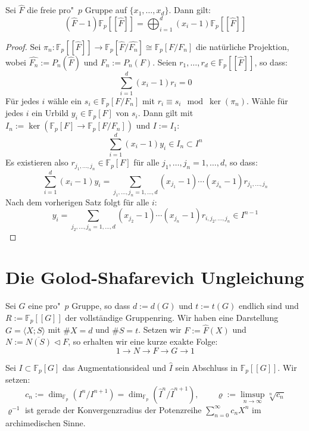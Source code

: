 \documentclass[11pt,a4paper,openany]{memoir}
\begin{document}
\begin{proposition}\label{prop:Ex2}
Sei $\widehat{F}$ die freie pro"~$p$ Gruppe auf $\{x_1,\ldots,x_d\}$. Dann gilt:
\[(\widehat{F}-1)\mathbb{F}_p[[\widehat{F}]]=\bigoplus_{i=1}^d (x_i-1)\mathbb{F}_p[[\widehat{F}]]\]
\end{proposition}

\begin{proof}
Sei $\pi_n: \mathbb{F}_p[[\widehat{F}]]\to \mathbb{F}_p[\widehat{F}/\widehat{F_n}]\cong \mathbb{F}_p[F/F_n] $ die natürliche Projektion, wobei $\widehat{F_n}:=P_n(\widehat{F})$ und $F_n:=P_n(F)$. Seien $r_1,\ldots,r_d\in \mathbb{F}_p[[\widehat{F}]]$, so dass:
\[\sum_{i=1}^d(x_i-1)r_i=0 \]
Für jedes $i$ wähle ein $s_i\in \mathbb{F}_p[F/F_n]$ mit $r_i\equiv s_{i}\mod \ker(\pi_n)$. Wähle für jedes $i$ ein Urbild $y_i\in\mathbb{F}_p[F]$ von $s_i$. Dann gilt mit $I_n:=\ker(\mathbb{F}_p[F]\to\mathbb{F}_p[F/F_n])$ und $I:=I_1$:
\[ \sum_{i=1}^d(x_i-1)y_i\in I_n\subset I^n \]
Es existieren also $r_{j_1,\ldots,j_n}\in\mathbb{F}_p[F]$ für alle $j_1,\ldots,j_n=1,\ldots,d$, so dass:
\[  \sum_{i=1}^d(x_i-1)y_i = \sum_{j_1,\ldots,j_n=1,\ldots,d} (x_{j_1}-1)\cdots (x_{j_n}-1) r_{j_1,\ldots,j_n} \]
Nach dem vorherigen Satz folgt für alle $i$:
\[y_i = \sum_{j_2,\ldots,j_n=1,\ldots,d} (x_{j_2}-1)\cdots (x_{j_n}-1)r_{i,j_2,\ldots, j_n} \in I^{n-1} \]
\end{proof}
\fi

\section{Die Golod-Shafarevich Ungleichung}

Sei $G$ eine pro"~$p$ Gruppe, so dass $d:=d(G)$ und $t:=t(G)$ endlich sind und $R:=\mathbb{F}_p[[G]]$ der vollständige Gruppenring. Wir haben eine Darstellung $G=\langle X;S\rangle$ mit $\#X=d$ und $\#S=t$. Setzen wir $F:=\widehat{F}(X)$ und $N:=\overline{N(S)}\lhd F$, so erhalten wir eine kurze exakte Folge:
\[ 1\to N\to F\to G\to 1 \]

\begin{definition}
Sei $I\subset\mathbb{F}_p[G]$ das Augmentationsideal und $\widehat{I}$ sein Abschluss in $\mathbb{F}_p[[G]]$. Wir setzen:
\[ c_n := \dim_{\mathbb{F}_p}(I^n/I^{n+1}) =\dim_{\mathbb{F}_p}(\widehat{I}^n/\widehat{I}^{n+1}),\qquad \varrho:=\limsup_{n\to\infty}\sqrt[n]{c_n} \]
$\varrho^{-1}$ ist gerade der Konvergenzradius der Potenzreihe $\sum_{n=0}^\infty c_n X^n$ im archimedischen Sinne.
\end{definition}
\end{document}
